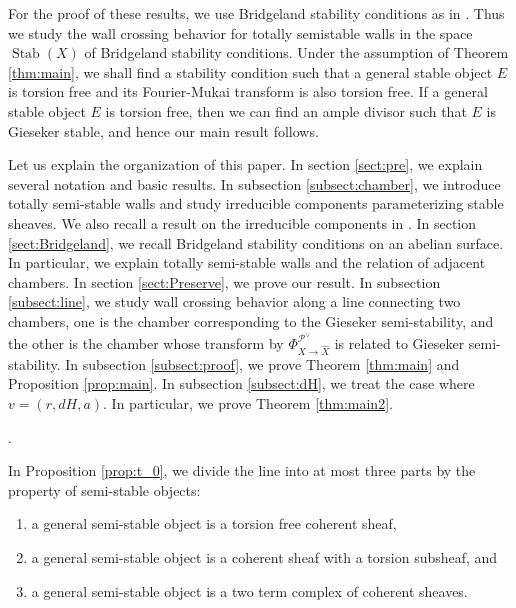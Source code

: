 \documentclass[10pt]{amsart}
\def\cal{\mathcal}
\newenvironment{NB}{
\color{red}{\bf NB}. \footnotesize 
}{}
\newcommand{\Stab}{\operatorname{Stab}}
\numberwithin{equation}{section}
\theoremstyle{plain}
\theoremstyle{definition}
\theoremstyle{remark}
\begin{document}
For the proof of these results, we use Bridgeland stability conditions as in \cite{CNY2}.
Thus we study the wall crossing behavior for totally semistable walls in the space $\Stab(X)$ of Bridgeland
stability conditions.
Under the assumption of Theorem \ref{thm:main}, we shall find a stability condition such that
a general stable object $E$ is torsion free and its Fourier-Mukai transform is also torsion free.
If a general stable object $E$ is torsion free, then we can find an ample divisor
such that $E$ is Gieseker stable, and hence our main result follows.





Let us explain the organization of this paper.
In section \ref{sect:pre},
we explain several notation and basic results.
In subsection \ref{subsect:chamber}, we introduce totally semi-stable walls and
study irreducible components parameterizing stable sheaves.
We also recall a result on the irreducible components in \cite{CNY2}.
In section \ref{sect:Bridgeland},
we recall Bridgeland stability conditions on an abelian surface. 
In particular, we explain totally semi-stable walls and
the relation of adjacent chambers.
In section \ref{sect:Preserve}, we prove our result.
In subsection \ref{subsect:line},
we study wall crossing behavior along a line connecting two chambers,
one is the chamber corresponding to the Gieseker semi-stability, and 
the other is the chamber whose transform by 
$\Phi_{X \to \widehat{X}}^{{\cal P}^{\vee}}$ is related to Gieseker semi-stability. 
In subsection \ref{subsect:proof}, we prove Theorem \ref{thm:main} and
Proposition \ref{prop:main}.
In subsection \ref{subsect:dH}, we treat the case where $v=(r,dH,a)$. In particular,
we prove Theorem \ref{thm:main2}.

\begin{NB}
In Proposition \ref{prop:t_0}, 
we divide the line into at most three parts by the property of semi-stable objects: 
\begin{enumerate}
\item
a general semi-stable object is a torsion free coherent sheaf,
\item
a general semi-stable object is
a coherent sheaf with a torsion subsheaf, and 
\item
a general semi-stable object is
a two term complex of coherent sheaves.    
\end{enumerate}
\end{NB}
\end{document}
